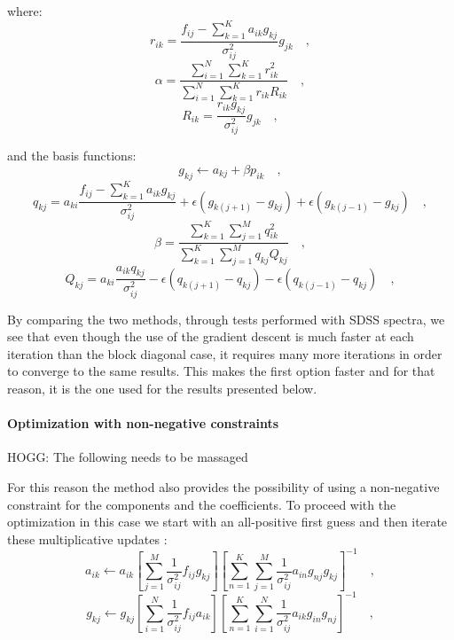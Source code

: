 \documentclass[12pt,preprint]{aastex}
\begin{document}
where:
\begin{equation}\label{eq:11}
r_{ik}=\frac{f_{ij}-\sum_{k=1}^{K}a_{ik}g_{kj}}{\sigma^2_{ij}}g_{jk}
\quad ,
\end{equation}
\begin{equation}\label{eq:12}
\alpha=\frac{\sum_{i=1}^{N}\sum_{k=1}^{K}r^2_{ik}}{\sum_{i=1}^{N}\sum_{k=1}^{K}r_{ik}R_{ik}}
\quad ,
\end{equation}
\begin{equation}\label{eq:13}
R_{ik}=\frac{r_{ik}g_{kj}}{\sigma^2_{ij}}g_{jk}
\quad ,
\end{equation}

and the basis functions:
\begin{equation}\label{eq:14}
g_{kj} \gets a_{kj}+\beta p_{ik}
\quad ,
\end{equation}
\begin{equation}\label{eq:15}
q_{kj}=a_{ki}\frac{f_{ij}-\sum_{k=1}^{K}a_{ik}g_{kj}}{\sigma^2_{ij}}+\epsilon(g_{k(j+1)}-g_{kj})+\epsilon(g_{k(j-1)}-g_{kj})
\quad ,
\end{equation}
\begin{equation}\label{eq:16}
\beta=\frac{\sum_{k=1}^{K}\sum_{j=1}^{M}q^2_{ik}}{\sum_{k=1}^{K}\sum_{j=1}^{M}q_{kj}Q_{kj}}
\quad ,
\end{equation}
\begin{equation}\label{eq:17}
Q_{kj}=a_{ki}\frac{a_{ik}q_{kj}}{\sigma^2_{ij}}-\epsilon(q_{k(j+1)}-q_{kj})-\epsilon(q_{k(j-1)}-q_{kj})
\quad ,
\end{equation}

By comparing the two methods, through tests performed with SDSS
spectra, we see that even though the use of the gradient descent is
much faster at each iteration than the block diagonal case, it
requires many more iterations in order to converge to the same
results. This makes the first option faster and for that reason, it is
the one used for the results presented below.

\paragraph{Optimization with non-negative constraints}

HOGG:  The following needs to be massaged

For this reason the method also provides the possibility of using a
non-negative constraint for the components and the coefficients. To
proceed with the optimization in this case we start with an
all-positive first guess and then iterate these multiplicative updates
\citep{blanton}:
\begin{equation}\label{eq:6}
a_{ik} \gets a_{ik}\left[\sum_{j=1}^{M}\frac{1}{\sigma^2_{ij}}f_{ij}g_{kj}\right]\left[\sum_{n=1}^{K}\sum_{j=1}^{M}\frac{1}{\sigma^2_{ij}}a_{in}g_{nj}g_{kj}\right]^{-1}
\quad ,
\end{equation}
\begin{equation}\label{eq:7}
g_{kj} \gets g_{kj}\left[\sum_{i=1}^{N}\frac{1}{\sigma^2_{ij}}f_{ij}a_{ik}\right]\left[\sum_{n=1}^{K}\sum_{i=1}^{N}\frac{1}{\sigma^2_{ij}}a_{ik}g_{in}g_{nj}\right]^{-1}
\quad ,
\end{equation}
\end{document}

